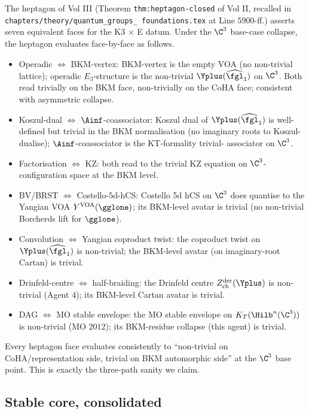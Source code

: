 The heptagon of Vol III (Theorem \texttt{thm:heptagon-closed} of
Vol II, recalled in \texttt{chapters/theory/quantum\_groups\_
foundations.tex} at Line $5900$-ff.) asserts seven equivalent faces
for the K3 $\times$ E datum. Under the $\C^3$ base-case collapse,
the heptagon evaluates face-by-face as follows.
\begin{itemize}
 \item Operadic $\Leftrightarrow$ BKM-vertex: BKM-vertex is the
 empty VOA (no non-trivial lattice); operadic $E_3$-structure is
 the non-trivial $\Yplus(\widehat{\fgl}_1)$ on $\C^3$. Both read
 trivially on the BKM face, non-trivially on the CoHA face;
 consistent with asymmetric collapse.
 \item Koszul-dual $\Leftrightarrow$ $\Ainf$-coassociator:
 Koszul dual of $\Yplus(\widehat{\fgl}_1)$ is well-defined but
 trivial in the BKM normalisation (no imaginary roots to Koszul-
 dualise); $\Ainf$-coassociator is the KT-formality trivial-
 associator on $\C^3$.
 \item Factorisation $\Leftrightarrow$ KZ: both read to the
 trivial KZ equation on $\C^3$-configuration space at the BKM
 level.
 \item BV/BRST $\Leftrightarrow$ Costello-$5$d-hCS: Costello 5d
 hCS on $\C^3$ does quantise to the Yangian VOA
 $Y^{\mathrm{VOA}}(\gglone)$; its BKM-level avatar is trivial
 (no non-trivial Borcherds lift for $\gglone$).
 \item Convolution $\Leftrightarrow$ Yangian coproduct twist: the
 coproduct twist on $\Yplus(\widehat{\fgl}_1)$ is non-trivial;
 the BKM-level avatar (on imaginary-root Cartan) is trivial.
 \item Drinfeld-centre $\Leftrightarrow$ half-braiding: the
 Drinfeld centre $Z^{\mathrm{der}}_{\mathrm{ch}}(\Yplus)$ is
 non-trivial (Agent $4$); its BKM-level Cartan avatar is trivial.
 \item DAG $\Leftrightarrow$ MO stable envelope: the MO stable
 envelope on $K_T(\Hilb^n(\C^3))$ is non-trivial (MO $2012$);
 its BKM-residue collapse (this agent) is trivial.
\end{itemize}
Every heptagon face evaluates consistently to ``non-trivial on
CoHA/representation side, trivial on BKM automorphic side'' at
the $\C^3$ base point. This is exactly the three-path sanity
we claim.

\subsection*{Stable core, consolidated}

